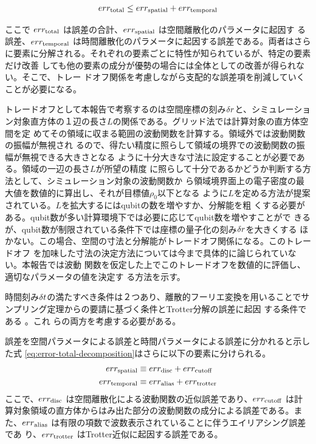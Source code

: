 \documentclass[fontsize=11pt]{jlreq}
\begin{document}
\begin{equation}
err_{\mathrm{total}} \leq err_{\mathrm{spatial}} + err_{\mathrm{temporal}}
\label{eq:error-total-decomposition}
\end{equation}

ここで $err_{\mathrm{total}}$ は誤差の合計、$err_{\mathrm{spatial}}$ は空間離散化のパラメータに起因す
る誤差、$err_{\mathrm{temporal}}$ は時間離散化のパラメータに起因する誤差である。両者はさら
に要素に分解される。それぞれの要素ごとに特性が知られているが、特定の要素だけ改善
しても他の要素の成分が優勢の場合には全体としての改善が得られない。そこで、トレー
ドオフ関係を考慮しながら支配的な誤差項を削減していくことが必要になる。

トレードオフとして本報告で考察するのは空間座標の刻み$\delta r$と、シミュレーショ
ン対象直方体の１辺の長さ$L$の関係である。グリッド法では計算対象の直方体空間を定
めてその領域に収まる範囲の波動関数を計算する。領域外では波動関数の振幅が無視され
るので、得たい精度に照らして領域の境界での波動関数の振幅が無視できる大きさとなる
ように十分大きな寸法に設定することが必要である。領域の一辺の長さ$L$が所望の精度
に照らして十分であるかどうか判断する方法として、シミュレーション対象の波動関数か
ら領域境界面上の電子密度の最大値を数値的に算出し、それが目標値$\rho_0$以下となる
ように$L$を定める方法が提案されている\cite[Supplementary material, S8, A. Space
Cost]{Chan2023.sciadv.abo7484}。$L$を拡大するにはqubitの数を増やすか、分解能を粗
くする必要がある。qubit数が多い計算環境下では必要に応じてqubit数を増やすことがで
きるが、qubit数が制限されている条件下では座標の量子化の刻み$\delta r$を大きくする
ほかない。この場合、空間の寸法と分解能がトレードオフ関係になる。このトレードオフ
を加味した寸法の決定方法については今まで具体的に論じられていない。本報告では波動
関数を仮定した上でこのトレードオフを数値的に評価し、適切なパラメータの値を決定す
る方法を示す。

時間刻み$\delta t$の満たすべき条件は２つあり、離散的フーリエ変換を用いることでサ
ンプリング定理からの要請に基づく条件\cite{FEIT1982412}とTrotter分解の誤差に起因
する条件である
\cite{Childs2021.PhysRevX.11.011020,Burgarth2024.PhysRevResearch.6.043155}。これ
らの両方を考慮する必要がある。

誤差を空間パラメータによる誤差と時間パラメータによる誤差に分かれると示した式
\ref{eq:error-total-decomposition}はさらに以下の要素に分けられる。
\begin{align}
    err_{\mathrm{spatial}} &\equiv err_{\mathrm{disc}} + err_{\mathrm{cutoff}} \\
    err_{\mathrm{temporal}} &\equiv err_{\mathrm{alias}} + err_{\mathrm{trotter}}
\end{align}
ここで、$err_{\mathrm{disc}}$ は空間離散化による波動関数の近似誤差であり、$err_{\mathrm{cutoff}}$ は計
算対象領域の直方体からはみ出た部分の波動関数の成分による誤差である。ま
た、$err_{\mathrm{alias}}$ は有限の項数で波数表示されていることに伴うエイリアシング誤差であ
り、$err_{\mathrm{trotter}}$ はTrotter近似に起因する誤差である。
\end{document}
